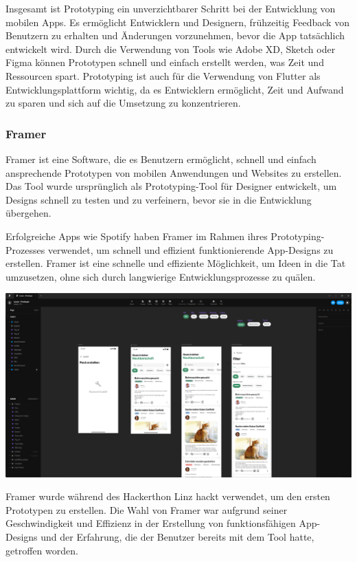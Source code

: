 Insgesamt ist Prototyping ein unverzichtbarer Schritt bei der Entwicklung von mobilen Apps. Es ermöglicht Entwicklern und Designern, frühzeitig Feedback von Benutzern zu erhalten und Änderungen vorzunehmen, bevor die App tatsächlich entwickelt wird. Durch die Verwendung von Tools wie Adobe XD, Sketch oder Figma können Prototypen schnell und einfach erstellt werden, was Zeit und Ressourcen spart. Prototyping ist auch für die Verwendung von Flutter als Entwicklungsplattform wichtig, da es Entwicklern ermöglicht, Zeit und Aufwand zu sparen und sich auf die Umsetzung zu konzentrieren.
\subsubsection{Framer}

Framer ist eine Software, die es Benutzern ermöglicht, schnell und einfach ansprechende Prototypen von mobilen Anwendungen und Websites zu erstellen. Das Tool wurde ursprünglich als Prototyping-Tool für Designer entwickelt, um Designs schnell zu testen und zu verfeinern, bevor sie in die Entwicklung übergehen.

Erfolgreiche Apps wie Spotify haben Framer im Rahmen ihres
Prototyping-Prozesses verwendet, um schnell und effizient
funktionierende App-Designs zu erstellen. Framer ist eine
schnelle und effiziente Möglichkeit, um Ideen in die Tat
umzusetzen, ohne sich durch langwierige Entwicklungsprozesse
zu quälen.

\includegraphics[width=1\textwidth]{pics/nochba-framer-prototype-screenshot.png}


Framer wurde während des Hackerthon Linz hackt verwendet, um den ersten Prototypen zu erstellen. Die Wahl von Framer war aufgrund seiner Geschwindigkeit und Effizienz in der Erstellung von funktionsfähigen App-Designs und der Erfahrung, die der Benutzer bereits mit dem Tool hatte, getroffen worden.

